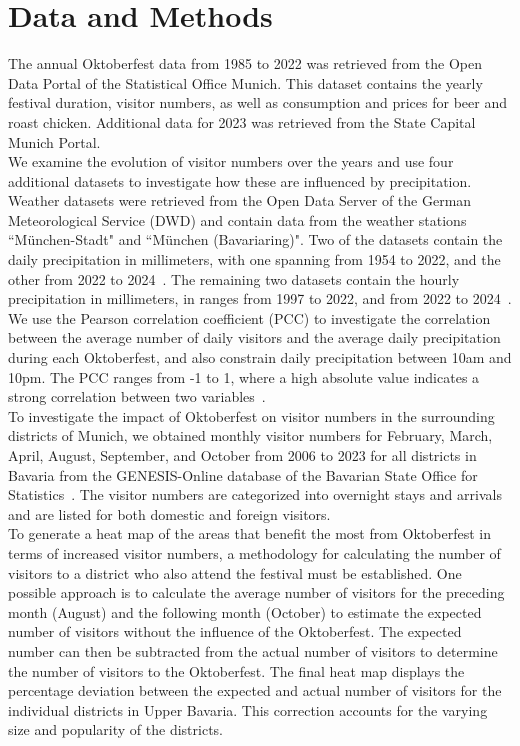 \documentclass{article}
\theoremstyle{plain}
\theoremstyle{definition}
\theoremstyle{remark}
\begin{document}
\section{Data and Methods}\label{sec:methods}
The annual Oktoberfest data from 1985 to 2022 was retrieved from the Open Data Portal of the Statistical Office Munich. This dataset contains the yearly festival duration, visitor numbers, as well as consumption and prices for beer and roast chicken. Additional data for 2023 was retrieved from the State Capital Munich Portal. \\
We examine the evolution of visitor numbers over the years and use four additional datasets to investigate how these are influenced by precipitation. Weather datasets were retrieved from the Open Data Server of the German Meteorological Service (DWD) and contain data from the weather stations ``München-Stadt" and ``München (Bavariaring)". Two of the datasets contain the daily precipitation in millimeters, with one spanning from 1954 to 2022, and the other from 2022 to 2024~\citep{3,4}. The remaining two datasets contain the hourly precipitation in millimeters, in ranges from 1997 to 2022, and from 2022 to 2024~\citep{1,2}. We use the Pearson correlation coefficient (PCC) to investigate the correlation between the average number of daily visitors and the average daily precipitation during each Oktoberfest, and also constrain daily precipitation between 10am and 10pm. The PCC ranges from -1 to 1, where a high absolute value indicates a strong correlation between two variables~\cite{thonield}.\\
To investigate the impact of Oktoberfest on visitor numbers in the surrounding districts of Munich, we obtained monthly visitor numbers for February, March, April, August, September, and October from 2006 to 2023 for all districts in Bavaria from the GENESIS-Online database of the Bavarian State Office for Statistics~\citep{table_GENESIS}. The visitor numbers are categorized into overnight stays and arrivals and are listed for both domestic and foreign visitors.\\
To generate a heat map of the areas that benefit the most from Oktoberfest in terms of increased visitor numbers, a methodology for calculating the number of visitors to a district who also attend the festival must be established. One possible approach is to calculate the average number of visitors for the preceding month (August) and the following month (October) to estimate the expected number of visitors without the influence of the Oktoberfest. The expected number can then be subtracted from the actual number of visitors to determine the number of visitors to the Oktoberfest. The final heat map displays the percentage deviation between the expected and actual number of visitors for the individual districts in Upper Bavaria. This correction accounts for the varying size and popularity of the districts.\\
\end{document}
